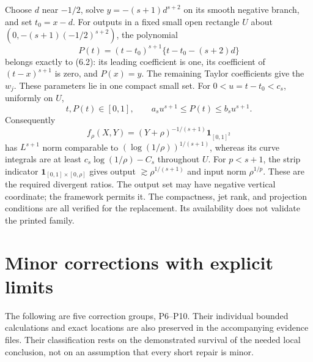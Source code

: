 \documentclass[10pt]{article}
\begin{document}
Choose \(d\) near \(-1/2\), solve \(y=-(s+1)d^{s+2}\) on its smooth negative branch, and set \(t_0=x-d\). For outputs in a fixed small open rectangle \(U\) about \((0,-(s+1)(-1/2)^{s+2})\), the polynomial \[P(t)=(t-t_0)^{s+1}\{t-t_0-(s+2)d\}
 \tag{6.3}\] belongs exactly to (6.2): its leading coefficient is one, its coefficient of \((t-x)^{s+1}\) is zero, and \(P(x)=y\). The remaining Taylor coefficients give the \(w_j\). These parameters lie in one compact small set. For \(0<u=t-t_0<c_s\), uniformly on \(U\), \[t,P(t)\in[0,1],\qquad a_su^{s+1}\le P(t)\le b_su^{s+1}.\] Consequently \[f_\rho(X,Y)=(Y+\rho)^{-1/(s+1)}\mathbf1_{[0,1]^2}\] has \(L^{s+1}\) norm comparable to \((\log(1/\rho))^{1/(s+1)}\), whereas its curve integrals are at least \(c_s\log(1/\rho)-C_s\) throughout \(U\). For \(p<s+1\), the strip indicator \(\mathbf1_{[0,1]\times[0,\rho]}\) gives output \(\gtrsim\rho^{1/(s+1)}\) and input norm \(\rho^{1/p}\). These are the required divergent ratios. The output set may have negative vertical coordinate; the framework permits it. The compactness, jet rank, and projection conditions are all verified for the replacement. Its availability does not validate the printed family.\par
\section*{Minor corrections with explicit limits}
The following are five correction groups, P6–P10. Their individual bounded calculations and exact locations are also preserved in the accompanying evidence files. Their classification rests on the demonstrated survival of the needed local conclusion, not on an assumption that every short repair is minor.\par
\end{document}
